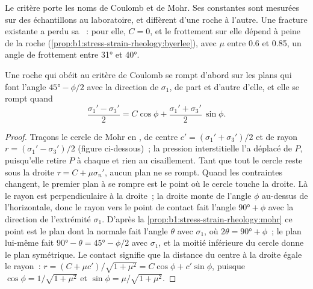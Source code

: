 Le critère porte les noms de Coulomb et de Mohr. Ses constantes sont mesurées
sur des échantillons au laboratoire, et diffèrent d'une roche à l'autre. Une fracture
existante a perdu sa ~: pour elle, $C = 0$, et le frottement sur elle
dépend à peine de la roche (\cref{prop:b1:stress-strain-rheology:byerlee}),
avec $\mu$ entre 0.6 et 0.85, un angle de frottement entre \ang{31} et
\ang{40}.

\begin{theorem}\label{thm:b1:stress-strain-rheology:failure-angle}
Une roche qui obéit au critère de Coulomb se rompt d'abord sur les plans qui font
l'angle $\ang{45} - \phi/2$ avec la direction de $\sigma_1$, de part et d'autre
d'elle, et elle se rompt quand
\[
  \frac{\sigma_1' - \sigma_3'}{2} = C\cos\phi + \frac{\sigma_1' + \sigma_3'}{2}\,\sin\phi .
\]
\end{theorem}

\begin{proof}
Traçons le cercle de Mohr en , de centre $c' =
(\sigma_1'+\sigma_3')/2$ et de rayon $r = (\sigma_1'-\sigma_3')/2$
(figure ci-dessous)~; la pression interstitielle l'a déplacé
de $P$, puisqu'elle retire $P$ à chaque  et rien au
cisaillement. Tant que tout le cercle reste sous la droite $\tau = C + \mu\sigma_n'$,
aucun plan ne se rompt. Quand les contraintes changent, le premier plan à se rompre est le
point où le cercle touche la droite. Là le rayon est perpendiculaire à
la droite~; la droite monte de l'angle $\phi$ au-dessus de l'horizontale, donc le
rayon vers le point de contact fait l'angle $\ang{90} + \phi$ avec la
direction de l'extrémité $\sigma_1$. D'après la \cref{prop:b1:stress-strain-rheology:mohr}
ce point est le plan dont la normale fait l'angle $\theta$ avec $\sigma_1$,
où $2\theta = \ang{90} + \phi$~; le plan lui-même fait
$\ang{90} - \theta = \ang{45} - \phi/2$ avec $\sigma_1$, et la moitié inférieure du
cercle donne le plan symétrique. Le contact signifie que la distance du
centre à la droite égale le rayon~:
$r = (C + \mu c')/\sqrt{1+\mu^2} = C\cos\phi + c'\sin\phi$, puisque
$\cos\phi = 1/\sqrt{1+\mu^2}$ et $\sin\phi = \mu/\sqrt{1+\mu^2}$.
\end{proof}

